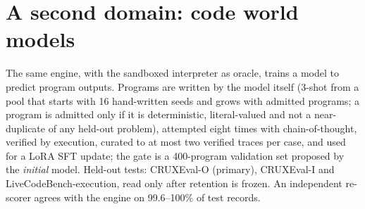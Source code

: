 \section{A second domain: code world models}
\label{sec:code}

The same engine, with the sandboxed interpreter as oracle, trains a model to predict program outputs. Programs are written by the model itself (3-shot from a pool that starts with 16 hand-written seeds and grows with admitted programs; a program is admitted only if it is deterministic, literal-valued and not a near-duplicate of any held-out problem), attempted eight times with chain-of-thought, verified by execution, curated to at most two verified traces per case, and used for a LoRA SFT update; the gate is a 400-program validation set proposed by the \emph{initial} model. Held-out tests: CRUXEval-O (primary), CRUXEval-I and LiveCodeBench-execution, read only after retention is frozen. An independent re-scorer agrees with the engine on 99.6--100\% of test records.

